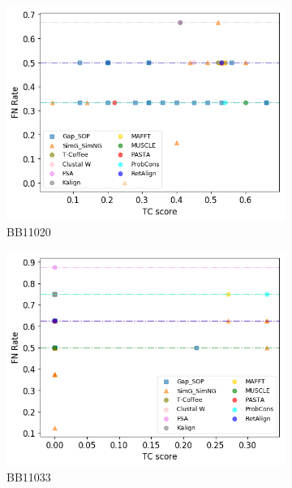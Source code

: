 \begin{figure}[!htbp]
\begin{adjustwidth}{-1cm}{-1cm}
		\begin{subfigure}{0.22\textwidth}
			\includegraphics[width=\columnwidth]{Figure/summary/precomputedInit/Balibase/BB11020_fnrate_vs_tc_2}
			\caption{BB11020}
		\end{subfigure}
		\begin{subfigure}{0.22\textwidth}
			\includegraphics[width=\columnwidth]{Figure/summary/precomputedInit/Balibase/BB11033_fnrate_vs_tc_2}
			\caption{BB11033}
		\end{subfigure}	
		\begin{subfigure}{0.22\textwidth}

\end{subfigure}
\end{adjustwidth}
\end{figure}

